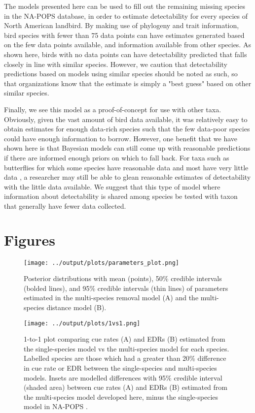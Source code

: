 \documentclass[12pt]{article}
\begin{document}
\par The models presented here can be used to fill out the remaining missing species in the NA-POPS database, in order to estimate detectability for every species of North American landbird.
By making use of phylogeny and trait information, bird species with fewer than 75 data points can have estimates generated based on the few data points available, and information available from other species.
As shown here, birds with no data points can have detectability predicted that falls closely in line with similar species.
However, we caution that detectability predictions based on models using similar species should be noted as such, so that organizations know that the estimate is simply a "best guess" based on other similar species.

\par Finally, we see this model as a proof-of-concept for use with other taxa.
Obviously, given the vast amount of bird data available, it was relatively easy to obtain estimates for enough data-rich species such that the few data-poor species could have enough information to borrow. 
However, one benefit that we have shown here is that Bayesian models can still come up with reasonable predictions if there are informed enough priors on which to fall back.
For taxa such as butterflies for which some species have reasonable data and most have very little data \citep{lewthwaite_geographical_2022}, a researcher may still be able to glean reasonable estimates of detectability with the little data available. 
We suggest that this type of model where information about detectability is shared among species be tested with taxon that generally have fewer data collected.



\section{Figures}

\begin{figure}[h]
	\texttt{[image: ../output/plots/parameters\_plot.png]}
	\caption{Posterior distributions with mean (points), 50\% credible intervals (bolded lines), and 95\% credible intervals (thin lines) of parameters estimated in the multi-species removal model (A) and the multi-species distance model (B).}
	\label{fig:params}
\end{figure}

\begin{figure}[h]
	\texttt{[image: ../output/plots/1vs1.png]}
	\caption{1-to-1 plot comparing cue rates (A) and EDRs (B) estimated from the single-species model vs the multi-species model for each species. Labelled species are those which had a greater than 20\% difference in cue rate or EDR between the single-species and multi-species models. Insets are modelled differences with 95\% credible interval (shaded area) between cue rates (A) and EDRs (B) estimated from the multi-species model developed here, minus the single-species model in NA-POPS \citep{edwards_point_2023}.}
	\label{fig:1vs1}
\end{figure}
\end{document}
